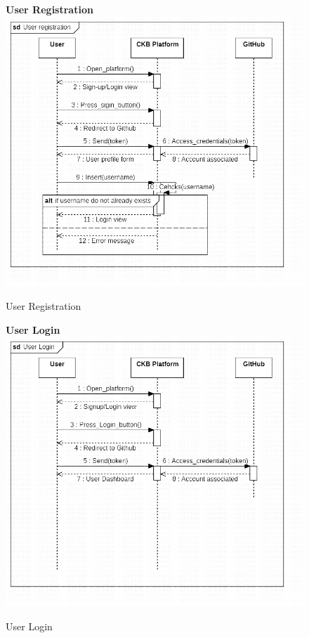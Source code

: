 \begin{enumerate}[label=\textbf{[UC\arabic*]}]

    \begin{figure}[!h]
    \item \textbf{User Registration}
    \centering
    \includegraphics[width=\textwidth]{Images/User registration.jpg}
    \caption{User Registration}
    \label{fig:enter-label}
    \end{figure}

    \begin{figure}
    \item \textbf{User Login}
    \centering
    \includegraphics[width= \textwidth]{Images/User login.jpeg}
    \caption{User Login}
    \label{fig:enter-label}
    \end{figure}




\end{enumerate}
